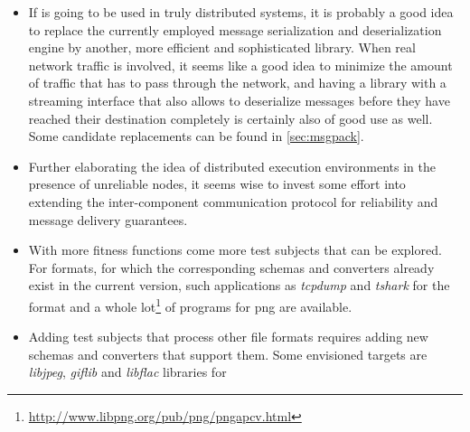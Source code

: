 \begin{itemize}
counters, which are provided by modern hardware and can be directly accessed in most operating systems by
means of special APIs like the one provided by the {\small PAPI}\cite{Mucci99papi:a} library. Note that
this would impose a limitation on the concurrent use of \xmlmate on a single machine; however, this limitation
can probably be solved by using virtualization techniques like {\small Docker}\cite{docker} and {\small
Vagrant}\cite{vagrant} - especially since \xmlmate is now a distributed system capable of running across
multiple distinct hardware nodes. This arrangement can also be of special benefit to creating a fitness
function specialized in detecting buffer overflows by means of advanced operating system features like memory
page marking and eviction. One library specializing in such techniques of memory debugging is {\small
DUMA}\footnote{\url{http://sourceforge.net/projects/duma/}}, which is a spiritual heir to the discontinued Electric Fence project.
\item[]If \xmlmate is going to be used in truly distributed systems, it is probably a good idea to replace
the currently employed \msgpack message serialization and deserialization engine by another, more efficient and
sophisticated library. When real network traffic is involved, it seems like a good idea to minimize the amount
of traffic that has to pass through the network, and having a library with a streaming interface that also
allows to deserialize messages before they have reached their destination completely is certainly also of
good use as well. Some candidate replacements can be found in \cref{sec:msgpack}.
\item[]Further elaborating the idea of distributed execution environments in the presence of unreliable
nodes, it seems wise to invest some effort into extending the inter-component communication protocol for
reliability and message delivery guarantees.
\item[]With more fitness functions come more test subjects that can be explored. For formats, for which the
corresponding schemas and converters already exist in the current version, such applications as \emph{tcpdump}
and \emph{tshark} for the \pcap format and a whole
lot\footnote{\url{http://www.libpng.org/pub/png/pngapcv.html}} of programs for {\small png} are available.
\item[]Adding test subjects that process other file formats requires adding new schemas and converters that
support them. Some envisioned targets are \emph{libjpeg}, \emph{giflib} and \emph{libflac} libraries for

\end{itemize}

